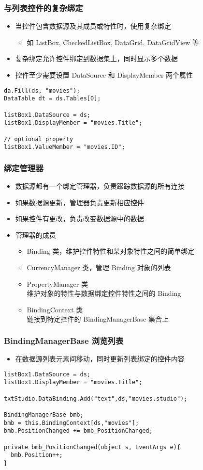 \begin{frame}[fragile]
\frametitle{与列表控件的复杂绑定}
\begin{itemize}
\item 当控件包含数据源及其成员或特性时，使用复杂绑定
\begin{itemize}
\item 如 ListBox, CheckedListBox, DataGrid, DataGridView 等
\end{itemize}
\item 复杂绑定允许控件绑定到数据集上，同时显示多个数据
\item 控件至少需要设置 DataSource 和 DisplayMember 两个属性
\end{itemize}
\begin{lstlisting}
da.Fill(ds, "movies");
DataTable dt = ds.Tables[0];

listBox1.DataSource = ds;
listBox1.DisplayMember = "movies.Title";

// optional property
listBox1.ValueMember = "movies.ID";
\end{lstlisting}
\end{frame}

\begin{frame}[fragile]
\frametitle{绑定管理器}
\begin{itemize}
\item 数据源都有一个绑定管理器，负责跟踪数据源的所有连接
\item 如果数据源更新，管理器负责更新相应控件
\item 如果控件有更改，负责改变数据源中的数据
\item 管理器的成员
\begin{itemize}
\item Binding 类，维护控件特性和某对象特性之间的简单绑定
\item CurrencyManager 类，管理 Binding 对象的列表
\item PropertyManager 类\\维护对象的特性与数据绑定控件特性之间的 Binding
\item BindingContext 类\\链接到特定控件的 BindingManagerBase 集合上
\end{itemize}
\end{itemize}
\end{frame}

\begin{frame}[fragile]
\frametitle{BindingManagerBase 浏览列表}
\begin{itemize}
\item 在数据源列表元素间移动，同时更新列表绑定的控件内容
\end{itemize}
\begin{lstlisting}
listBox1.DataSource = ds;
listBox1.DisplayMember = "movies.Title";

txtStudio.DataBinding.Add("text",ds,"movies.studio");

BindingManagerBase bmb;
bmb = this.BindingContext[ds,"movies"];
bmb.PositionChanged += bmb_PositionChanged;

private bmb_PositionChanged(object s, EventArgs e){
  bmb.Position++;
}
\end{lstlisting}
\end{frame}

